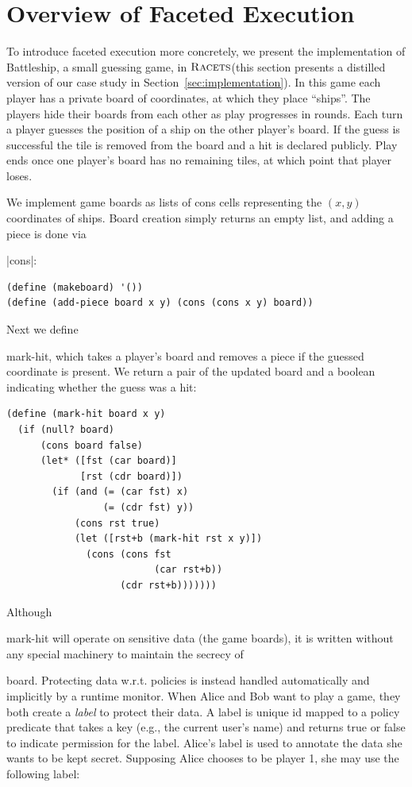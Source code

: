 \documentclass[review=true,acmlarge]{acmart}
\newcommand*{\SavedLstInline}{}
\DeclareRobustCommand*{\lstinline}{%
  \ifmmode
    \let\SavedBGroup\bgroup
    \def\bgroup{%
      \let\bgroup\SavedBGroup
      \hbox\bgroup
    }%
  \fi
  \SavedLstInline
}
\newcommand{\blue}[1] {{\color{colorMATH} #1}}
\newcommand{\code}[1]{\lstinline{#1}}
\newcommand{\racets}[0]{$\textsc{Racets}$\xspace}
\begin{document}
\section{Overview of Faceted Execution}
\label{sec:overview}

To introduce faceted execution more concretely, we present the implementation
of Battleship, a small guessing game, in \racets (this section presents a
distilled version of our case study in
Section~\ref{sec:implementation}). In this game each player has a
private board of coordinates, at which they place ``ships''. The players
hide their boards from each other as play progresses in rounds. Each
turn a player guesses the position of a ship on the other player's
board. If the guess is successful the tile is removed from the
board and a hit is declared publicly. Play ends once one player's board
has no remaining tiles, at which point that player loses.

We implement game boards as lists of cons cells representing the
\blue{$(x,y)$} coordinates of ships. Board creation simply returns an empty
list, and adding a piece is done via \lstinline|cons|:

\begin{lstlisting}[language=Racket,escapechar=|,name=example]
(define (makeboard) '())
(define (add-piece board x y) (cons (cons x y) board))
\end{lstlisting}

Next we define \code{mark-hit}, which takes a player's board and
removes a piece if the guessed coordinate is present. We 
return a pair of the updated board and a boolean indicating
whether the guess was a hit:

\begin{lstlisting}[language=Racket,escapechar=|,name=example]
(define (mark-hit board x y)
  (if (null? board)
      (cons board false)
      (let* ([fst (car board)]
             [rst (cdr board)])
        (if (and (= (car fst) x)
                 (= (cdr fst) y))
            (cons rst true)
            (let ([rst+b (mark-hit rst x y)])
              (cons (cons fst
                          (car rst+b))
                    (cdr rst+b)))))))
\end{lstlisting}

Although \code{mark-hit} will operate on sensitive data (the game
boards), it is written without any special machinery to maintain the
secrecy of \code{board}. Protecting data {w.r.t.} policies is instead handled
automatically and implicitly by a runtime monitor.
When Alice and Bob want to play a game, they both create a
\emph{label} to protect their data. A label is unique id mapped to a policy predicate
that takes a key (e.g., the current user's name) and returns true or false to indicate
permission for the label. Alice's label is used to annotate the data she wants
to be kept secret. Supposing Alice chooses to be player 1, she may use the
following label:
\end{document}
